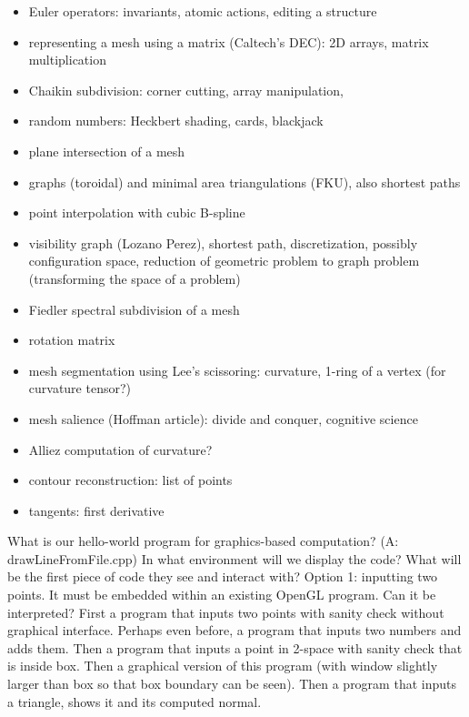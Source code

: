 \documentclass[11pt]{article}
\begin{document}
\begin{itemize}
\item Euler operators: invariants, atomic actions, editing a structure
\item representing a mesh using a matrix (Caltech's DEC): 2D arrays, matrix multiplication
\item Chaikin subdivision: corner cutting, array manipulation, 
\item random numbers: Heckbert shading, cards, blackjack
\item plane intersection of a mesh
\item graphs (toroidal) and minimal area triangulations (FKU), also shortest paths
\item point interpolation with cubic B-spline
\item visibility graph (Lozano Perez), shortest path, discretization, possibly configuration space,
      reduction of geometric problem to graph problem (transforming the space of a problem)
\item Fiedler spectral subdivision of a mesh
\item rotation matrix
\item mesh segmentation using Lee's scissoring: curvature, 1-ring of a vertex (for curvature tensor?)
\item mesh salience (Hoffman article): divide and conquer, cognitive science
\item Alliez computation of curvature?
\item contour reconstruction: list of points
\item tangents: first derivative
\end{itemize}

What is our hello-world program for graphics-based computation? (A: drawLineFromFile.cpp)
In what environment will we display the code?
What will be the first piece of code they see and interact with?
Option 1: inputting two points.
It must be embedded within an existing OpenGL program.
Can it be interpreted?
First a program that inputs two points with sanity check without graphical interface.
Perhaps even before, a program that inputs two numbers and adds them.
Then a program that inputs a point in 2-space with sanity check that is inside box.
Then a graphical version of this program (with window slightly larger than box so that box boundary
can be seen).
Then a program that inputs a triangle, shows it and its computed normal.
\end{document}

